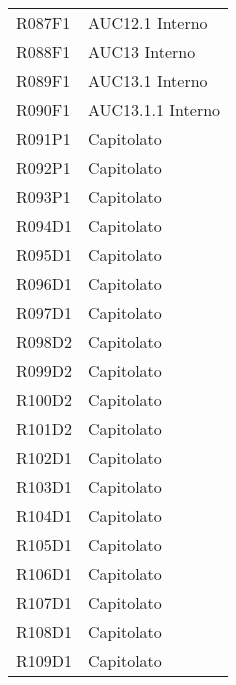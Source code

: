 \documentclass[../analisi-dei-requisiti.tex]{subfiles}
\begin{document}
\begin{longtable}[H]{ p{3cm} | p{4cm} }
  R087F1                               & AUC12.1 Interno               \\
  R088F1                               & AUC13 Interno                 \\
  R089F1                               & AUC13.1 Interno               \\
  R090F1                               & AUC13.1.1 Interno             \\
  R091P1                               & Capitolato                    \\
  R092P1                               & Capitolato                    \\
  R093P1                               & Capitolato                    \\
  R094D1                               & Capitolato                    \\
  R095D1                               & Capitolato                    \\
  R096D1                               & Capitolato                    \\
  R097D1                               & Capitolato                    \\
  R098D2                               & Capitolato                    \\
  R099D2                               & Capitolato                    \\
  R100D2                               & Capitolato                    \\
  R101D2                               & Capitolato                    \\
  R102D1                               & Capitolato                    \\
  R103D1                               & Capitolato                    \\
  R104D1                               & Capitolato                    \\
  R105D1                               & Capitolato                    \\
  R106D1                               & Capitolato                    \\
  R107D1                               & Capitolato                    \\
  R108D1                               & Capitolato                    \\
  R109D1                               & Capitolato                    \\

\end{longtable}
\end{document}
